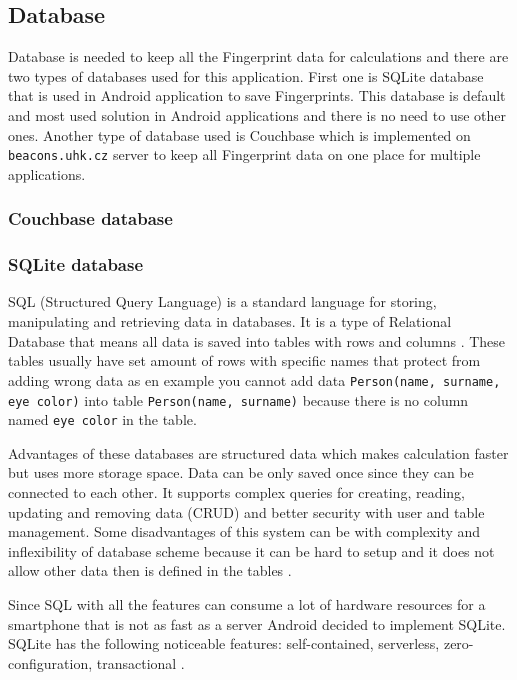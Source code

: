 \subsection{Database}\label{subsec:Database}
Database is needed to keep all the Fingerprint data for calculations and there are two types of databases used for this application. First one is SQLite database that is used in Android application to save Fingerprints. This database is default and most used solution in Android applications and there is no need to use other ones. Another type of database used is Couchbase which is implemented on \verb|beacons.uhk.cz| server to keep all Fingerprint data on one place for multiple applications.

\subsubsection{Couchbase database}\label{subsec:CouchbaseDatabase}

\subsubsection{SQLite database}\label{subsec:SQLiteDatabase}
SQL (Structured Query Language) is a standard language for storing, manipulating and retrieving data in databases. It is a type of Relational Database that means all data is saved into tables with rows and columns \cite{ItSQL}. These tables usually have set amount of rows with specific names that protect from adding wrong data as en example you cannot add data \verb|Person(name, surname, eye color)| into table \verb|Person(name, surname)| because there is no column named \verb|eye color| in the table.

Advantages of these databases are structured data which makes calculation faster but uses more storage space. Data can be only saved once since they can be connected to each other. It supports complex queries for creating, reading, updating and removing data (CRUD) and better security with user and table management. Some disadvantages of this system can be with complexity and inflexibility of database scheme because it can be hard to setup and it does not allow other data then is defined in the tables \cite{ERDMS}.

Since SQL with all the features can consume a lot of hardware resources for a smartphone that is not as fast as a server Android decided to implement SQLite. SQLite has the following noticeable features: self-contained, serverless, zero-configuration, transactional \cite{WISQLITE}.

